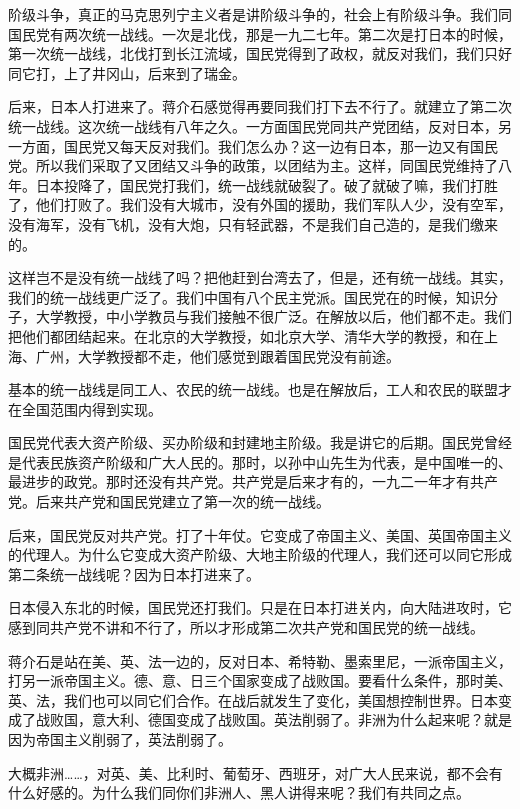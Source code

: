 \begin{list}{}
阶级斗争，真正的马克思列宁主义者是讲阶级斗争的，社会上有阶级斗争。我们同国民党有两次统一战线。一次是北伐，那是一九二七年。第二次是打日本的时候，第一次统一战线，北伐打到长江流域，国民党得到了政权，就反对我们，我们只好同它打，上了井冈山，后来到了瑞金。

后来，日本人打进来了。蒋介石感觉得再要同我们打下去不行了。就建立了第二次统一战线。这次统一战线有八年之久。一方面国民党同共产党团结，反对日本，另一方面，国民党又每天反对我们。我们怎么办？这一边有日本，那一边又有国民党。所以我们采取了又团结又斗争的政策，以团结为主。这样，同国民党维持了八年。日本投降了，国民党打我们，统一战线就破裂了。破了就破了嘛，我们打胜了，他们打败了。我们没有大城市，没有外国的援助，我们军队人少，没有空军，没有海军，没有飞机，没有大炮，只有轻武器，不是我们自己造的，是我们缴来的。

这样岂不是没有统一战线了吗？把他赶到台湾去了，但是，还有统一战线。其实，我们的统一战线更广泛了。我们中国有八个民主党派。国民党在的时候，知识分子，大学教授，中小学教员与我们接触不很广泛。在解放以后，他们都不走。我们把他们都团结起来。在北京的大学教授，如北京大学、清华大学的教授，和在上海、广州，大学教授都不走，他们感觉到跟着国民党没有前途。

基本的统一战线是同工人、农民的统一战线。也是在解放后，工人和农民的联盟才在全国范围内得到实现。

国民党代表大资产阶级、买办阶级和封建地主阶级。我是讲它的后期。国民党曾经是代表民族资产阶级和广大人民的。那时，以孙中山先生为代表，是中国唯一的、最进步的政党。那时还没有共产党。共产党是后来才有的，一九二一年才有共产党。后来共产党和国民党建立了第一次的统一战线。

后来，国民党反对共产党。打了十年仗。它变成了帝国主义、美国、英国帝国主义的代理人。为什么它变成大资产阶级、大地主阶级的代理人，我们还可以同它形成第二条统一战线呢？因为日本打进来了。

日本侵入东北的时候，国民党还打我们。只是在日本打进关内，向大陆进攻时，它感到同共产党不讲和不行了，所以才形成第二次共产党和国民党的统一战线。

蒋介石是站在美、英、法一边的，反对日本、希特勒、墨索里尼，一派帝国主义，打另一派帝国主义。德、意、日三个国家变成了战败国。要看什么条件，那时美、英、法，我们也可以同它们合作。在战后就发生了变化，美国想控制世界。日本变成了战败国，意大利、德国变成了战败国。英法削弱了。非洲为什么起来呢？就是因为帝国主义削弱了，英法削弱了。

大概非洲……，对英、美、比利时、葡萄牙、西班牙，对广大人民来说，都不会有什么好感的。为什么我们同你们非洲人、黑人讲得来呢？我们有共同之点。


\end{list}
